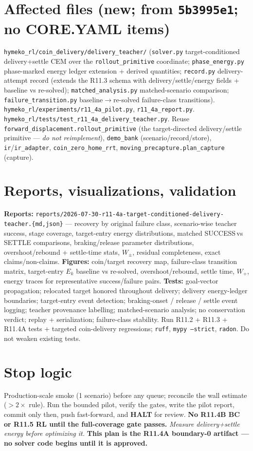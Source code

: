 \documentclass[11pt]{article}
\newcommand{\code}[1]{\texttt{\small #1}}
\newcommand{\halt}{\textcolor{red!70!black}{\textbf{HALT}}}
\begin{document}
\section{Affected files (new; from \code{5b3995e1}; no CORE.YAML items)}
\code{hymeko\_rl/coin\_delivery/delivery\_teacher/} (\code{solver.py} target-conditioned delivery+settle CEM over the
\code{rollout\_primitive} coordinate; \code{phase\_energy.py} phase-marked energy ledger extension + derived quantities;
\code{record.py} delivery-attempt record (extends the R11.3 schema with delivery/settle/energy fields + baseline vs
re-solved); \code{matched\_analysis.py} matched-scenario comparison; \code{failure\_transition.py} baseline$\to$re-solved
failure-class transitions). \code{hymeko\_rl/experiments/r11\_4a\_pilot.py}, \code{r11\_4a\_report.py}.
\code{hymeko\_rl/tests/test\_r11\_4a\_delivery\_teacher.py}. Reuse \code{forward\_displacement.rollout\_primitive} (the
target-directed delivery/settle primitive --- \emph{do not reimplement}), \code{demo\_bank} (scenario/record/store),
\code{ir}/\code{ir\_adapter}, \code{coin\_zero\_home\_rrt}, \code{moving\_precapture.plan\_capture} (capture).

\section{Reports, visualizations, validation}
\textbf{Reports:} \code{reports/2026-07-30-r11-4a-target-conditioned-delivery-teacher.\{md,json\}} --- recovery by original
failure class, scenario-wise teacher success, stage coverage, target-entry energy distributions, matched
SUCCESS\,vs\,SETTLE comparisons, braking/release parameter distributions, overshoot/rebound + settle-time stats, $W_\pm$,
residual completeness, exact claims/non-claims. \textbf{Figures:} coin/target recovery map, failure-class transition
matrix, target-entry $E_k$ baseline vs re-solved, overshoot/rebound, settle time, $W_+$, energy traces for representative
success/failure pairs. \textbf{Tests:} goal-vector propagation; relocated target honored throughout delivery; delivery
energy-ledger boundaries; target-entry event detection; braking-onset / release / settle event logging; teacher provenance
labelling; matched-scenario analysis; no conservation verdict; replay + serialization; failure-class stability. Run R11.2
+ R11.3 + R11.4A tests + targeted coin-delivery regressions; \code{ruff}, \code{mypy --strict}, \code{radon}. Do not weaken
existing tests.

\section{Stop logic}
Production-scale smoke (1 scenario) before any queue; reconcile the wall estimate ($>2\times$ rule). Run the bounded pilot,
verify the gates, write the pilot report, commit only then, push fast-forward, and \halt{} for review. \textbf{No R11.4B
BC or R11.5 RL until the full-coverage gate passes.} \emph{Measure delivery+settle energy before optimizing it.}
\textbf{This plan is the R11.4A boundary-0 artifact --- no solver code begins until it is approved.}
\end{document}
